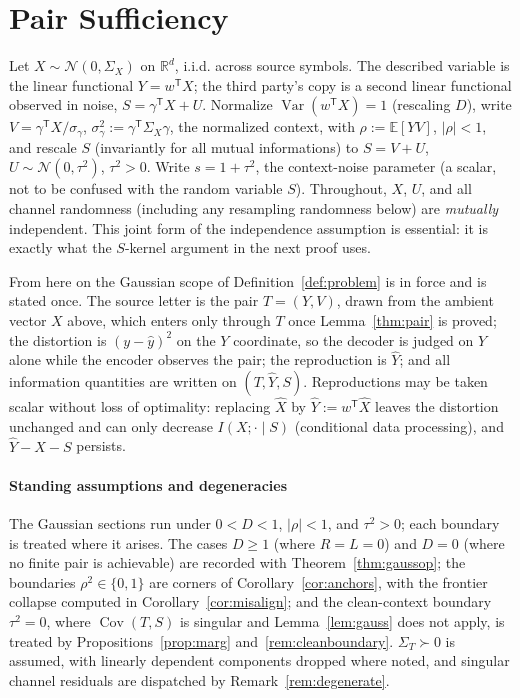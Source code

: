 \documentclass[11pt,onecolumn]{IEEEtran}
\newcommand{\E}{\mathbb{E}}
\newcommand{\R}{\mathbb{R}}
\newcommand{\Cov}{\operatorname{Cov}}
\newcommand{\hX}{\widehat{X}}
\newcommand{\hY}{\widehat{Y}}
\begin{document}
\section{Pair Sufficiency}
\label{sec:pair}

Let $X\sim\mathcal N(0,\Sigma_X)$ on $\R^d$, i.i.d. across source symbols.
The described variable is the linear functional $Y=w^{\mathsf T}X$; the third
party's copy is a second linear functional observed in noise,
$S=\gamma^{\mathsf T}X+U$. Normalize
$\operatorname{Var}(w^{\mathsf T}X)=1$ (rescaling $D$), write
$V=\gamma^{\mathsf T}X/\sigma_{\gamma}$, $\sigma_\gamma^2:=\gamma^{\mathsf T}\Sigma_X\gamma$,
the normalized context, with
$\rho:=\E[YV]$, $|\rho|<1$, and
rescale $S$ (invariantly for all mutual informations) to $S=V+U$,
$U\sim\mathcal N(0,\tau^2)$, $\tau^2>0$. Write $s=1+\tau^2$, the
context-noise parameter (a scalar, not to be confused with the random
variable $S$). Throughout,
$X$, $U$, and all channel randomness (including any resampling randomness
below) are \emph{mutually} independent. This joint form of the independence
assumption is essential: it is exactly what the $S$-kernel argument in
the next proof uses.

From here on the Gaussian scope of Definition~\ref{def:problem} is in
force and is stated once. The source letter is the pair $T=(Y,V)$, drawn
from the ambient vector $X$ above, which enters only through $T$ once
Lemma~\ref{thm:pair} is proved; the distortion is $(y-\hat y)^2$ on the
$Y$ coordinate, so the decoder is judged on $Y$ alone while the encoder
observes the pair; the reproduction is $\hY$; and all information
quantities are written on $(T,\hY,S)$. Reproductions may be
taken scalar without loss of optimality: replacing
$\hX$ by $\hY:=w^{\mathsf T}\hX$ leaves the distortion unchanged and can
only decrease $I(X;\cdot\mid S)$ (conditional data processing), and
$\hY-X-S$ persists.

\paragraph*{Standing assumptions and degeneracies}
The Gaussian sections run under $0<D<1$, $|\rho|<1$, and $\tau^2>0$;
each boundary is treated where it arises. The cases $D\ge1$ (where
$R=L=0$) and $D=0$ (where no finite pair is achievable) are recorded
with Theorem~\ref{thm:gaussop}; the boundaries $\rho^2\in\{0,1\}$ are
corners of Corollary~\ref{cor:anchors}, with the frontier collapse
computed in Corollary~\ref{cor:misalign}; and the clean-context boundary
$\tau^2=0$, where $\Cov(T,S)$ is singular and Lemma~\ref{lem:gauss} does
not apply, is treated by Propositions~\ref{prop:marg}
and~\ref{rem:cleanboundary}. $\Sigma_T\succ0$ is assumed, with linearly
dependent components dropped where noted, and singular channel residuals
are dispatched by Remark~\ref{rem:degenerate}.
\end{document}
